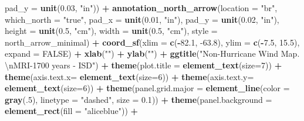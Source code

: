 \documentclass[12pt,oneside]{reedthesis}
\newenvironment{Shaded}{\begin{snugshade}}{\end{snugshade}}
\newcommand{\CharTok}[1]{\textcolor[rgb]{0.31,0.60,0.02}{#1}}
\newcommand{\DataTypeTok}[1]{\textcolor[rgb]{0.13,0.29,0.53}{#1}}
\newcommand{\DecValTok}[1]{\textcolor[rgb]{0.00,0.00,0.81}{#1}}
\newcommand{\FloatTok}[1]{\textcolor[rgb]{0.00,0.00,0.81}{#1}}
\newcommand{\KeywordTok}[1]{\textcolor[rgb]{0.13,0.29,0.53}{\textbf{#1}}}
\newcommand{\NormalTok}[1]{#1}
\newcommand{\OperatorTok}[1]{\textcolor[rgb]{0.81,0.36,0.00}{\textbf{#1}}}
\newcommand{\OtherTok}[1]{\textcolor[rgb]{0.56,0.35,0.01}{#1}}
\newcommand{\StringTok}[1]{\textcolor[rgb]{0.31,0.60,0.02}{#1}}
\begin{document}
\begin{Shaded}
\begin{Highlighting}[]
   \DataTypeTok{pad_y =} \KeywordTok{unit}\NormalTok{(}\FloatTok{0.03}\NormalTok{, }\StringTok{"in"}\NormalTok{)) }\OperatorTok{+}\StringTok{ }
\StringTok{  }\KeywordTok{annotation_north_arrow}\NormalTok{(}\DataTypeTok{location =} \StringTok{"br"}\NormalTok{, }\DataTypeTok{which_north =} \StringTok{"true"}\NormalTok{, }\DataTypeTok{pad_x =} \KeywordTok{unit}\NormalTok{(}\FloatTok{0.01}\NormalTok{, }\StringTok{"in"}\NormalTok{), }\DataTypeTok{pad_y =} \KeywordTok{unit}\NormalTok{(}\FloatTok{0.02}\NormalTok{, }\StringTok{"in"}\NormalTok{), }\DataTypeTok{height =} \KeywordTok{unit}\NormalTok{(}\FloatTok{0.5}\NormalTok{, }\StringTok{"cm"}\NormalTok{),}
   \DataTypeTok{width =} \KeywordTok{unit}\NormalTok{(}\FloatTok{0.5}\NormalTok{, }\StringTok{"cm"}\NormalTok{), }\DataTypeTok{style =}\NormalTok{ north_arrow_minimal) }\OperatorTok{+}
\StringTok{  }\KeywordTok{coord_sf}\NormalTok{(}\DataTypeTok{xlim =} \KeywordTok{c}\NormalTok{(}\OperatorTok{-}\FloatTok{82.1}\NormalTok{, }\FloatTok{-63.8}\NormalTok{), }\DataTypeTok{ylim =} \KeywordTok{c}\NormalTok{(}\OperatorTok{-}\FloatTok{7.5}\NormalTok{, }\FloatTok{15.5}\NormalTok{), }\DataTypeTok{expand =} \OtherTok{FALSE}\NormalTok{) }\OperatorTok{+}
\StringTok{  }\KeywordTok{xlab}\NormalTok{(}\StringTok{""}\NormalTok{) }\OperatorTok{+}\StringTok{ }
\StringTok{  }\KeywordTok{ylab}\NormalTok{(}\StringTok{""}\NormalTok{) }\OperatorTok{+}\StringTok{ }
\StringTok{  }\KeywordTok{ggtitle}\NormalTok{(}\StringTok{"Non-Hurricane Wind Map. }\CharTok{\textbackslash{}n}\StringTok{MRI-1700 years - ISD"}\NormalTok{) }\OperatorTok{+}\StringTok{ }
\StringTok{  }\KeywordTok{theme}\NormalTok{(}\DataTypeTok{plot.title =} \KeywordTok{element_text}\NormalTok{(}\DataTypeTok{size=}\DecValTok{7}\NormalTok{)) }\OperatorTok{+}
\StringTok{  }\KeywordTok{theme}\NormalTok{(}\DataTypeTok{axis.text.x=} \KeywordTok{element_text}\NormalTok{(}\DataTypeTok{size=}\DecValTok{6}\NormalTok{)) }\OperatorTok{+}\StringTok{ }
\StringTok{  }\KeywordTok{theme}\NormalTok{(}\DataTypeTok{axis.text.y=} \KeywordTok{element_text}\NormalTok{(}\DataTypeTok{size=}\DecValTok{6}\NormalTok{)) }\OperatorTok{+}
\StringTok{  }\KeywordTok{theme}\NormalTok{(}\DataTypeTok{panel.grid.major =} \KeywordTok{element_line}\NormalTok{(}\DataTypeTok{color =} \KeywordTok{gray}\NormalTok{(.}\DecValTok{5}\NormalTok{), }\DataTypeTok{linetype =} \StringTok{"dashed"}\NormalTok{, }\DataTypeTok{size =} \FloatTok{0.1}\NormalTok{)) }\OperatorTok{+}
\StringTok{  }\KeywordTok{theme}\NormalTok{(}\DataTypeTok{panel.background =} \KeywordTok{element_rect}\NormalTok{(}\DataTypeTok{fill =} \StringTok{"aliceblue"}\NormalTok{)) }\OperatorTok{+}

\end{Highlighting}
\end{Shaded}
\end{document}
